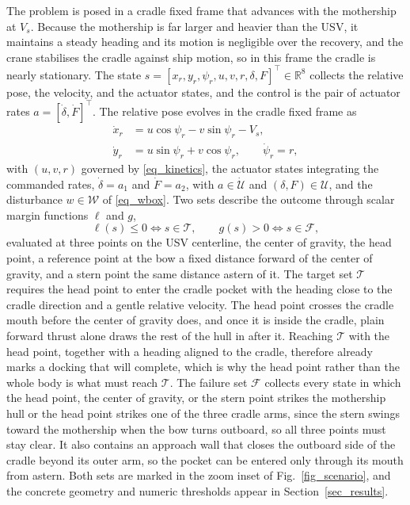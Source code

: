 \documentclass[5p,times,authoryear]{elsarticle}
\begin{document}
The problem is posed in a cradle fixed frame that advances with the mothership at $V_s$. Because the mothership is far larger and heavier than the USV, it maintains a steady heading and its motion is negligible over the recovery, and the crane stabilises the cradle against ship motion, so in this frame the cradle is nearly stationary. The state $s = [x_r, y_r, \psi_r, u, v, r, \delta, F]^\top \in \mathbb{R}^8$ collects the relative pose, the velocity, and the actuator states, and the control is the pair of actuator rates $a = [\dot\delta, \dot F]^\top$. The relative pose evolves in the cradle fixed frame as
\begin{equation}\label{eq_rel}
\begin{aligned}
\dot x_r &= u\cos\psi_r - v\sin\psi_r - V_s, \\
\dot y_r &= u\sin\psi_r + v\cos\psi_r,\qquad \dot\psi_r = r,
\end{aligned}
\end{equation}
with $(u, v, r)$ governed by \eqref{eq_kinetics}, the actuator states integrating the commanded rates, $\dot\delta = a_1$ and $\dot F = a_2$, with $a \in \dot{\mathcal{U}}$ and $(\delta, F)\in\mathcal{U}$, and the disturbance $w \in \mathcal{W}$ of \eqref{eq_wbox}. Two sets describe the outcome through scalar margin functions $\ell$ and $g$,
\begin{equation}\label{eq_margins}
\ell(s)\le 0 \iff s\in\mathcal{T},\qquad g(s)>0 \iff s\in\mathcal{F},
\end{equation}
evaluated at three points on the USV centerline, the center of gravity, the head point, a reference point at the bow a fixed distance forward of the center of gravity, and a stern point the same distance astern of it. The target set $\mathcal{T}$ requires the head point to enter the cradle pocket with the heading close to the cradle direction and a gentle relative velocity. The head point crosses the cradle mouth before the center of gravity does, and once it is inside the cradle, plain forward thrust alone draws the rest of the hull in after it. Reaching $\mathcal{T}$ with the head point, together with a heading aligned to the cradle, therefore already marks a docking that will complete, which is why the head point rather than the whole body is what must reach $\mathcal{T}$. The failure set $\mathcal{F}$ collects every state in which the head point, the center of gravity, or the stern point strikes the mothership hull or the head point strikes one of the three cradle arms, since the stern swings toward the mothership when the bow turns outboard, so all three points must stay clear. It also contains an approach wall that closes the outboard side of the cradle beyond its outer arm, so the pocket can be entered only through its mouth from astern. Both sets are marked in the zoom inset of Fig.~\ref{fig_scenario}, and the concrete geometry and numeric thresholds appear in Section~\ref{sec_results}.
\end{document}
